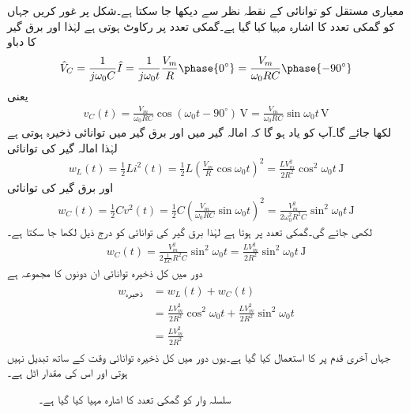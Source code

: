 معیاری مستقل  کو توانائی کے نقطہ نظر سے دیکھا جا سکتا ہے۔شکل  پر غور کریں جہاں  کو گمکی تعدد کا اشارہ مہیا کیا گیا ہے۔گمکی تعدد پر رکاوٹ  ہوتی ہے لہٰذا  اور برق گیر کا دباو 
\begin{align*}
\hat{V}_C=\frac{1}{j\omega_0 C} \hat{I}=\frac{1}{j\omega_0 t}\frac{V_m}{R}\phase{0^{\circ}}=\frac{V_m}{\omega_0 RC}\phase{-90^{\circ}}
\end{align*}
یعنی
\begin{align*}
v_C(t)=\frac{V_m}{\omega_0 RC} \cos (\omega_0 t -90^{\circ})\,\si{\volt}=\frac{V_m}{\omega_0 RC} \sin \omega_0 t \,\si{\volt}
\end{align*}
لکھا جائے گا۔آپ کو یاد ہو گا کہ امالہ گیر میں  اور برق گیر میں  توانائی ذخیرہ ہوتی ہے لہٰذا امالہ گیر کی توانائی
\begin{align}\label{مساوات_تعددی_امالی_ذخیرہ_توانائی}
w_L(t)=\frac{1}{2} L i^2(t)=\frac{1}{2} L \left(\frac{V_m}{R} \cos \omega_0 t\right)^2=\frac{L V_m^2}{2 R^2}\cos^2 \omega_0 t \, \si{\joule}
\end{align}
اور برق گیر کی توانائی
\begin{align*}
w_C(t)=\frac{1}{2} C v^2(t)=\frac{1}{2} C\left(\frac{V_m}{\omega_0 RC} \sin \omega_0 t\right)^2=\frac{V_m^2}{2\omega_0^2 R^2C}\sin^2 \omega_0 t \, \si{\joule}
\end{align*}
لکھی جائے گی۔گمکی تعدد پر  ہوتا ہے لہٰذا برق گیر کی توانائی کو درج ذیل لکھا جا سکتا ہے۔
\begin{align}\label{مساوات_تعددی_برق_گیر_ذخیرہ_توانائی}
w_C(t)=\frac{V_m^2}{2\frac{1}{LC} R^2C}\sin^2 \omega_0 t=\frac{LV_m^2}{2R^2}\sin^2 \omega_0 t \, \si{\joule}
\end{align}
دور میں کل ذخیرہ توانائی ان دونوں کا مجموعہ ہے
\begin{gather}
\begin{aligned}\label{مساوات_تعددی_کل_ذخیرہ_توانائی}
w_{\text{ذخیرہ}}&=w_L(t)+w_C(t)\\
&=\frac{LV_m^2}{2R^2}\cos^2 \omega_0 t+\frac{LV_m^2}{2R^2}\sin^2 \omega_0 t\\
&=\frac{LV_m^2}{2R^2}
\end{aligned}
\end{gather}
جہاں آخری قدم پر  کا استعمال کیا گیا ہے۔یوں دور میں کل ذخیرہ توانائی وقت کے ساتھ تبدیل نہیں ہوتی اور اس کی مقدار اٹل ہے۔
\begin{figure}
\centering
{}
\caption{سلسلہ وار  کو گمکی تعدد کا اشارہ مہیا کیا گیا ہے۔}
\label{شکل_تعددی_امالہ_معیاری_مستقل_توانائی_کے_نقطہ_نظر}
\end{figure}


